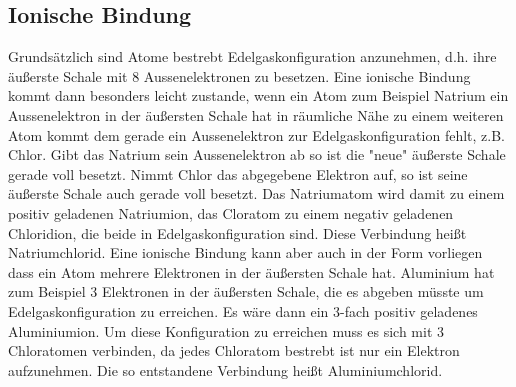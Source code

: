 	\subsection{Ionische Bindung}
	Grundsätzlich sind Atome bestrebt Edelgaskonfiguration anzunehmen, d.h. ihre äußerste Schale mit 8 Aussenelektronen zu besetzen. Eine ionische Bindung kommt dann besonders leicht zustande, wenn ein Atom zum Beispiel Natrium ein Aussenelektron in der äußersten Schale hat in räumliche Nähe zu einem weiteren Atom kommt dem gerade ein Aussenelektron zur Edelgaskonfiguration fehlt, z.B. Chlor. Gibt das Natrium sein Aussenelektron ab so ist die "neue" äußerste Schale gerade voll besetzt. Nimmt Chlor das abgegebene Elektron auf, so ist seine äußerste Schale auch gerade voll besetzt. Das Natriumatom wird damit zu einem positiv geladenen Natriumion, das Cloratom zu einem negativ geladenen Chloridion, die beide in Edelgaskonfiguration sind. Diese Verbindung heißt Natriumchlorid. Eine ionische Bindung kann aber auch in der Form vorliegen dass ein Atom mehrere Elektronen in der äußersten Schale hat. Aluminium hat zum Beispiel 3 Elektronen in der äußersten Schale, die es abgeben müsste um Edelgaskonfiguration zu erreichen. Es wäre dann ein 3-fach positiv geladenes Aluminiumion. Um diese Konfiguration zu erreichen muss es sich mit 3 Chloratomen verbinden, da jedes Chloratom bestrebt ist nur ein Elektron aufzunehmen. Die so entstandene Verbindung heißt Aluminiumchlorid.
	
